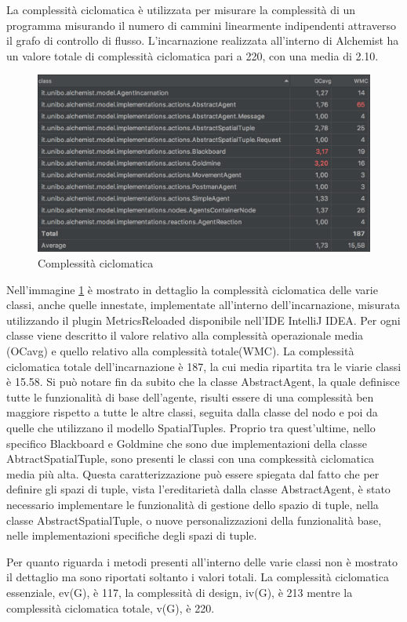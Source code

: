 La complessità ciclomatica è utilizzata per misurare la complessità di un programma misurando il numero di cammini linearmente indipendenti attraverso il grafo di controllo di flusso.
L'incarnazione realizzata all'interno di Alchemist ha un valore totale di complessità ciclomatica pari a 220, con una media di 2.10.
\begin{figure}[h] %
\begin{center} %
\includegraphics[width=14cm]{images/complessitaCiclomatica.png} %
\caption[Complessità ciclomatica]{Complessità ciclomatica} \label{fig:cyclomaticComplexity}
\end{center}
\end{figure}

Nell'immagine \ref{fig:cyclomaticComplexity} è mostrato in dettaglio la complessità ciclomatica delle varie classi, anche quelle innestate, implementate all'interno dell'incarnazione, misurata utilizzando il plugin MetricsReloaded disponibile nell'IDE IntelliJ IDEA. Per ogni classe viene descritto il valore relativo alla complessità operazionale media (OCavg) e quello relativo alla complessità totale(WMC).
La complessità ciclomatica totale dell'incarnazione è 187, la cui media ripartita tra le viarie classi è 15.58.
Si può notare fin da subito che la classe AbstractAgent, la quale definisce tutte le funzionalità di base dell'agente, risulti essere di una complessità ben maggiore rispetto a tutte le altre classi, seguita dalla classe del nodo e poi da quelle che utilizzano il modello SpatialTuples.
Proprio tra quest'ultime, nello specifico Blackboard e Goldmine che sono due implementazioni della classe AbtractSpatialTuple, sono presenti le classi con una compkessità ciclomatica media più alta. Questa caratterizzazione può essere spiegata dal fatto che per definire gli spazi di tuple, vista l'ereditarietà dalla classe AbstractAgent, è stato necessario implementare le funzionalità di gestione dello spazio di tuple, nella classe AbstractSpatialTuple, o nuove personalizzazioni della funzionalità base, nelle implementazioni specifiche degli spazi di tuple.

Per quanto riguarda i metodi presenti all'interno delle varie classi non è mostrato il dettaglio ma sono riportati soltanto i valori totali.
La complessità ciclomatica essenziale, ev(G), è 117, la complessità di design, iv(G), è 213 mentre la complessità ciclomatica totale, v(G), è 220.

